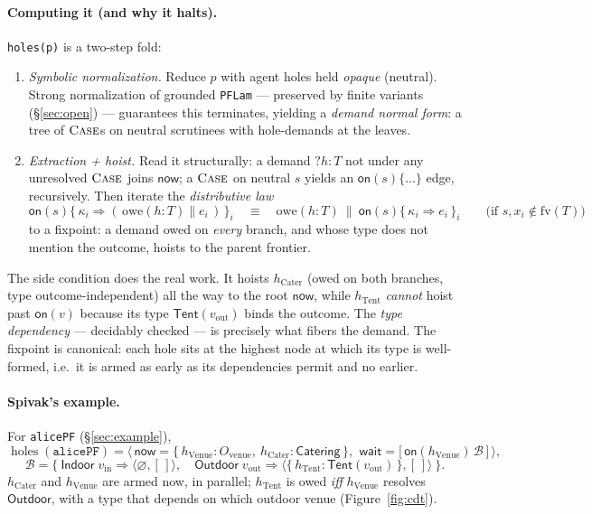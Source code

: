 \documentclass[11pt]{article}
\newcommand{\rul}[1]{\ensuremath{\textsc{#1}}}
\newcommand{\hole}[2]{\ensuremath{?#1\!:\!#2}}
\newcommand{\Holes}{\ensuremath{\operatorname{holes}}}
\newcommand{\code}[1]{\lstinline[language=rho,basicstyle=\ttfamily\small]|#1|}
\begin{document}
\paragraph{Computing it (and why it halts).} \lstinline[language=mettail,basicstyle=\ttfamily\small]|holes(p)| is a two-step fold:
\begin{enumerate}[leftmargin=1.6em,itemsep=2pt]
  \item \emph{Symbolic normalization.} Reduce $p$ with agent holes held \emph{opaque} (neutral).
  Strong normalization of grounded \texttt{PFLam} --- preserved by finite variants
  (\S\ref{sec:open}) --- guarantees this terminates, yielding a \emph{demand normal form}: a tree of
  $\rul{Case}$s on neutral scrutinees with hole-demands at the leaves.
  \item \emph{Extraction + hoist.} Read it structurally: a demand $\hole{h}{T}$ not under any
  unresolved $\rul{Case}$ joins $\mathsf{now}$; a $\rul{Case}$ on neutral $s$ yields an
  $\mathsf{on}(s)\{\dots\}$ edge, recursively. Then iterate the \emph{distributive law}
  \[
    \mathsf{on}(s)\{\, \kappa_i \Rightarrow (\,\mathrm{owe}(h{:}T)\parallel e_i\,) \,\}_i
    \quad\equiv\quad
    \mathrm{owe}(h{:}T)\ \parallel\ \mathsf{on}(s)\{\, \kappa_i \Rightarrow e_i \,\}_i
    \qquad
    \text{(if } s,x_i \notin \mathrm{fv}(T)\text{)}
  \]
  to a fixpoint: a demand owed on \emph{every} branch, and whose type does not mention the outcome,
  hoists to the parent frontier.
\end{enumerate}
The side condition does the real work. It hoists $h_{\mathrm{Cater}}$ (owed on both branches, type
outcome-independent) all the way to the root $\mathsf{now}$, while $h_{\mathrm{Tent}}$ \emph{cannot}
hoist past $\mathsf{on}(v)$ because its type $\mathsf{Tent}(v_{\mathrm{out}})$ binds the outcome. The
\emph{type dependency} --- decidably checked --- is precisely what fibers the demand. The fixpoint is
canonical: each hole sits at the highest node at which its type is well-formed, i.e.\ it is armed as
early as its dependencies permit and no earlier.

\paragraph{Spivak's example.} For \code{alicePF} (\S\ref{sec:example}),
\[
  \Holes(\mathtt{alicePF}) =
  \Big\langle\, \mathsf{now}=\{\,h_{\mathrm{Venue}}:\!O_{\mathrm{venue}},\ h_{\mathrm{Cater}}:\!\mathsf{Catering}\,\},\ \,
  \mathsf{wait}=\big[\,\mathsf{on}(h_{\mathrm{Venue}})\,\mathcal{B}\,\big] \,\Big\rangle,
\]
\[
  \mathcal{B} = \{\ \mathsf{Indoor}\;v_{\mathrm{in}} \Rightarrow \langle\varnothing,[\,]\rangle,
       \quad \mathsf{Outdoor}\;v_{\mathrm{out}} \Rightarrow \langle\{\,h_{\mathrm{Tent}}:\mathsf{Tent}(v_{\mathrm{out}})\,\},[\,]\rangle\ \}.
\]
$h_{\mathrm{Cater}}$ and $h_{\mathrm{Venue}}$ are armed now, in parallel; $h_{\mathrm{Tent}}$ is owed
\emph{iff} $h_{\mathrm{Venue}}$ resolves $\mathsf{Outdoor}$, with a type that depends on which outdoor
venue (Figure~\ref{fig:cdt}).
\end{document}
